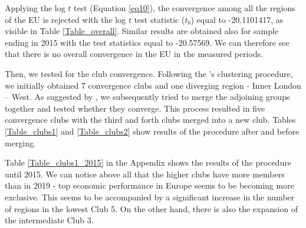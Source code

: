 \documentclass[11pt]{article}
\begin{document}
\begin{table}[!htbp] \centering 
 \caption{Log $t$ test result for all regions} 
  \label{Table_overall} 
\end{table}

Applying the log $t$ test (Equation \ref{eq10}), the convergence among all the regions of the EU is rejected with the log $t$ test statistic ($t_b$) equal to -20.1101417, as visible in Table \ref{Table_overall}. Similar results are obtained also for sample ending in 2015 with the test statistics equal to -20.57569. We can therefore see that there is no overall convergence in the EU in the measured periods.

Then, we tested for the club convergence. Following the \citeauthor{phillips2007transition}'s clustering procedure, we initially obtained 7 convergence clubs and one diverging region - Inner London – West. As suggested by \citet{bartkowska2012regional}, we subsequently tried to merge the adjoining groups together and tested whether they converge. This process resulted in five convergence clubs with the third and forth clubs merged into a new club. Tables \ref{Table_clubs1} and \ref{Table_clubs2} show results of the procedure after and before merging.

Table \ref{Table_clubs1_2015} in the Appendix shows the results of the \citeauthor{phillips2007transition} procedure until 2015. We can notice above all that the higher clubs have more members than in 2019 - top economic performance in Europe seems to be becoming more exclusive. This seems to be accompanied by a significant increase in the number of regions in the lowest Club 5. On the other hand, there is also the expansion of the intermediate Club 3.
\end{document}
